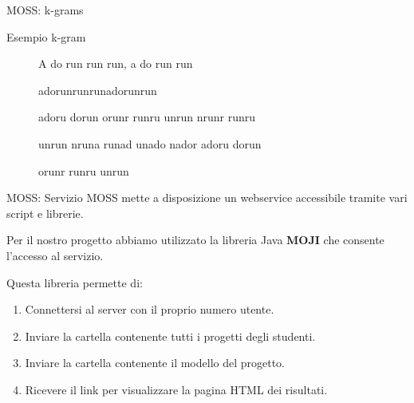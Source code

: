 \documentclass{beamer}
\begin{document}
	\begin{frame}{MOSS: k-grams}
		\begin{exampleblock}{Esempio k-gram}
			\vspace{-0.7cm}
			\begin{figure}
				{
					\begin{tcolorbox}
						A do run run run, a do run run
					\end{tcolorbox}
				}
				{
					\begin{tcolorbox}
						adorunrunrunadorunrun
					\end{tcolorbox}
				}
				
				{
					\begin{tcolorbox}
						adoru dorun orunr runru unrun nrunr runru
						
						unrun nruna runad unado nador adoru dorun
						
						orunr runru unrun 
					\end{tcolorbox}
				}
			\end{figure}
		\end{exampleblock}
	\end{frame}

	\begin{frame}{MOSS: Servizio}
		MOSS mette a disposizione un webservice accessibile tramite vari script e librerie.
		
		Per il nostro progetto abbiamo utilizzato la libreria Java \textbf{MOJI} che consente l'accesso al servizio.
		
		\pause
		Questa libreria permette di:
		\begin{enumerate}[<+->]
			\item Connettersi al server con il proprio numero utente.
			\item Inviare la cartella contenente tutti i progetti degli studenti.
			\item Inviare la cartella contenente il modello del progetto.
			\item Ricevere il link per visualizzare la pagina HTML dei risultati.
		\end{enumerate}
	\end{frame}
\end{document}
